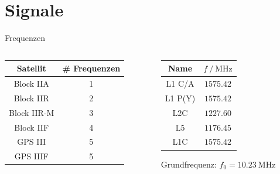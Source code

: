 \section{Signale}
\label{sec:signale}

\begin{frame}{Frequenzen}
    \begin{columns}
        \begin{column}{0.5\textwidth}
            \begin{table}
                \centering
                \begin{tabular}{c S[table-format=1.0]}
                    \toprule
                    {Satellit} & {\# Frequenzen} \\
                    \midrule
                    Block IIA   & 1 \\
                    Block IIR   & 2 \\
                    Block IIR-M & 3 \\
                    Block IIF   & 4 \\
                    GPS III     & 5 \\
                    GPS IIIF    & 5 \\
                    \bottomrule
                \end{tabular}
            \end{table}
        \end{column}
        \begin{column}{0.5\textwidth}
            \begin{table}
                \centering
                \begin{tabular}{c S[table-format=4.2]}
                    \toprule
                    {Name} & {$f\:/\:\si{\mega\hertz}$} \\
                    \midrule
                    L1 C/A  & $\num{1575.42}$ \\
                    L1 P(Y) & $\num{1575.42}$ \\
                    L2C     & $\num{1227.60}$ \\
                    L5      & $\num{1176.45}$ \\
                    L1C     & $\num{1575.42}$ \\
                    \bottomrule
                \end{tabular}
            \end{table}
            Grundfrequenz: $f_0 = \SI{10.23}{\mega\hertz}$
        \end{column}
    \end{columns}
\end{frame}

